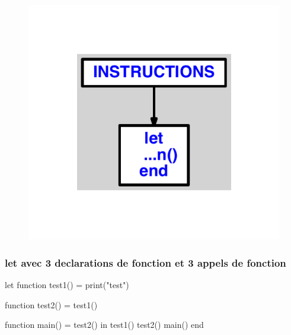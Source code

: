 \documentclass{article}
\begin{document}
\begin{figure}[H]\centering\includegraphics[max width=\textwidth]{ast/ast_264.pdf}\end{figure}\subsubsection{let avec 3 declarations de fonction et 3 appels de fonction}
\begin{verbatimtab}
let
	function test1() = print("test")

	function test2() = test1()

	function main() = test2()
in
	test1()
	test2()
	main()
end
\end{verbatimtab}
\end{document}
